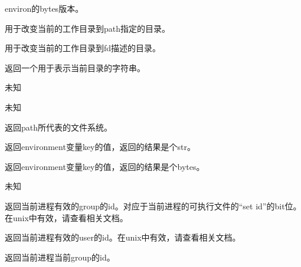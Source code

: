 \noindent{\color{red}{os.environb:}}
\par{environ的bytes版本。}\\

\noindent{\color{red}{os.chdir(path):}}
\par{用于改变当前的工作目录到path指定的目录。}\\

\noindent{\color{red}{os.fchdir(fd):}}
\par{用于改变当前的工作目录到fd描述的目录。}\\

\noindent{\color{red}{os.getcwd():}}
\par{返回一个用于表示当前目录的字符串。}\\

\noindent{\color{red}{os.fsencode(filename):}}
\par{未知}\\

\noindent{\color{red}{os.fsdecode(filename):}}
\par{未知}\\

\noindent{\color{red}{os.fspath(path):}}
\par{返回path所代表的文件系统。}\\

\noindent{\color{red}{os.getenv(key, default=None):}}
\par{返回environment变量key的值，返回的结果是个str。}\\

\noindent{\color{red}{os.getenvb(key, default=None):}}
\par{返回environment变量key的值，返回的结果是个bytes。}\\

\noindent{\color{red}{os.get\_exec\_path(env=None):}}
\par{未知}\\

\noindent{\color{red}{os.getegid():}}
\par{返回当前进程有效的group的id。对应于当前进程的可执行文件的“set id”的bit位。在unix中有效，请查看相关文档。}\\

\noindent{\color{red}{os.geteuid():}}
\par{返回当前进程有效的user的id。在unix中有效，请查看相关文档。}\\

\noindent{\color{red}{os.getgid():}}
\par{返回当前进程当前group的id。}\\

